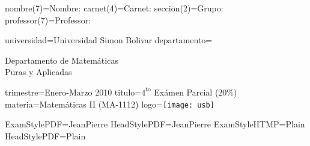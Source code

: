 nombre(7)=Nombre: 
carnet(4)=Carnet:
seccion(2)=Grupo:
professor(7)=Professor: 

universidad=Universidad Simon Bolivar
departamento=\begin{center}Departamento de Matem\'aticas\\Puras y Aplicadas\end{center}
trimestre=Enero-Marzo 2010
titulo=$4^{\mbox{to}}$ Ex\'amen Parcial (20\%)
materia=Matem\'aticas II (MA-1112)
logo=\texttt{[image: usb]}

ExamStylePDF=JeanPierre
HeadStylePDF=JeanPierre
ExamStyleHTMP=Plain
HeadStylePDF=Plain

\documentclass[12pt]{article}
\usepackage[utf8]{inputenc}                                                                               
\usepackage[spanish]{babel}    
\usepackage{amsmath,amstext,amscd,amsfonts,amssymb,amsthm}
\usepackage{epsfig}         
\newcommand{\re}{\mathbb R}                                                                               
\newcommand{\Ln}{\textrm{Ln}}                                                                             

\begin{Pregunta}{3}{1}                                                                                    
El valor del ${\displaystyle\int_{-\infty}^\infty\frac{{\rm d}x}{1+x^2}}$ es igual a:                  
\Opcion                                                                                                   
${\displaystyle\frac{\pi}{2}}$                                                                            
\Opcion                                                                                                   
${\displaystyle\pi}$                                                                                      
\Opcion                                                                                                   
No converge                                                                                               
\Opcion                                                                                                   
${\displaystyle-\frac{\pi}{4}}$                                                                           
\end{Pregunta}                                                                                            


